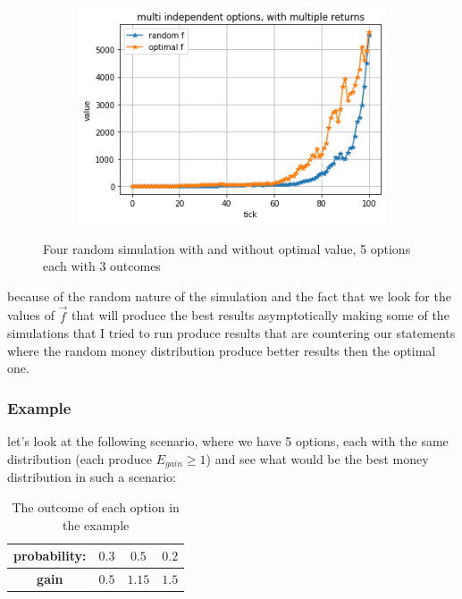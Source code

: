 \documentclass{article}
\begin{document}
\begin{figure}[!h]
\begin{subfigure}{0.525\textwidth}
	\end{subfigure}
	\begin{subfigure}{0.525\textwidth}
		\includegraphics[width=0.9\linewidth]{multi2-4}
	\end{subfigure}
	\caption{Four random simulation with and without optimal value, 5 options each with 3 outcomes}
	\label{Fig:multi2}
\end{figure}
	because of the random nature of the simulation and the fact that we look for the values of $\overrightarrow{f}$ that will produce the best results asymptotically making some of the simulations that I tried to run produce results that are countering our statements where the random money distribution produce better results then the optimal one.
	\newpage
	\subsubsection{Example}
	let's look at the following scenario, where we have 5 options, each with the same distribution (each produce $E_{gain} \ge 1$) and see what would be the best money distribution in such a scenario:\newline
	
	\begin{table}[!h]
		\centering\begin{tabular}{|c||c|c|c|}
			\hline
			\textbf{probability:} & $0.3$ & $0.5$ & $0.2$ \\ 
			\hline
			 \textbf{gain} & $0.5$ & $1.15$ & $1.5$  \\
			 \hline
		\end{tabular}
	\caption{The outcome of each option in the example}
	\end{table}
	
\end{document}

